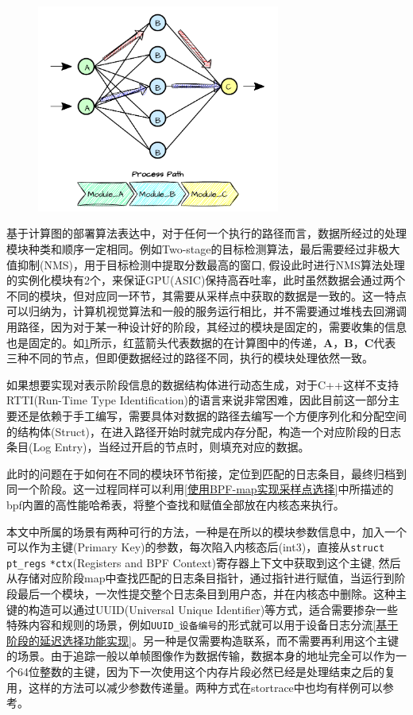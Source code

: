 \documentclass[master]{shtthesis}
\begin{document}
\begin{figure}[htbp]
	\centering
	\includegraphics[width=8cm]{img/path.pdf}
	\label{rbpath}
\end{figure}


基于计算图的部署算法表达中，对于任何一个执行的路径而言，数据所经过的处理模块种类和顺序一定相同。例如Two-stage的目标检测算法\cite{burke2017meta}，最后需要经过非极大值抑制(NMS)，用于目标检测中提取分数最高的窗口, 假设此时进行NMS算法处理的实例化模块有2个，来保证GPU(ASIC)保持高吞吐率，此时虽然数据会通过两个不同的模块，但对应同一环节，其需要从采样点中获取的数据是一致的。这一特点可以归纳为，计算机视觉算法和一般的服务运行相比，并不需要通过堆栈去回溯调用路径，因为对于某一种设计好的阶段，其经过的模块是固定的，需要收集的信息也是固定的。如\ref{rbpath}所示，红蓝箭头代表数据的在计算图中的传递，\textbf{A}，\textbf{B}，\textbf{C}代表三种不同的节点，但即便数据经过的路径不同，执行的模块处理依然一致。

如果想要实现对表示阶段信息的数据结构体进行动态生成，对于C++这样不支持RTTI(Run-Time Type Identification)的语言来说非常困难，因此目前这一部分主要还是依赖于手工编写，需要具体对数据的路径去编写一个方便序列化和分配空间的结构体(Struct)，在进入路径开始时就完成内存分配，构造一个对应阶段的日志条目(Log Entry)，当经过开启的节点时，则填充对应的数据。

此时的问题在于如何在不同的模块环节衔接，定位到匹配的日志条目，最终归档到同一个阶段。这一过程同样可以利用\ref{使用BPF-map实现采样点选择}中所描述的bpf内置的高性能哈希表，将整个查找和赋值全部放在内核态来执行。

本文中所属的场景有两种可行的方法，一种是在所以的模块参数信息中，加入一个可以作为主键(Primary Key)的参数，每次陷入内核态后(int3)，直接从\verb*|struct| \verb*|pt_regs| \verb*|*ctx|(Registers and BPF Context)寄存器上下文中获取到这个主键, 然后从存储对应阶段map中查找匹配的日志条目指针，通过指针进行赋值，当运行到阶段最后一个模块，一次性提交整个日志条目到用户态，并在内核态中删除。这种主键的构造可以通过UUID(Universal Unique Identifier)等方式，适合需要掺杂一些特殊内容和规则的场景，例如\verb*|UUID_设备编号|的形式就可以用于设备日志分流\ref{基于阶段的延迟选择功能实现}。另一种是仅需要构造联系，而不需要再利用这个主键的场景。由于追踪一般以单帧图像作为数据传输，数据本身的地址完全可以作为一个64位整数的主键，因为下一次使用这个内存片段必然已经是处理结束之后的复用，这样的方法可以减少参数传递量。两种方式在stortrace中也均有样例可以参考。
\end{document}
